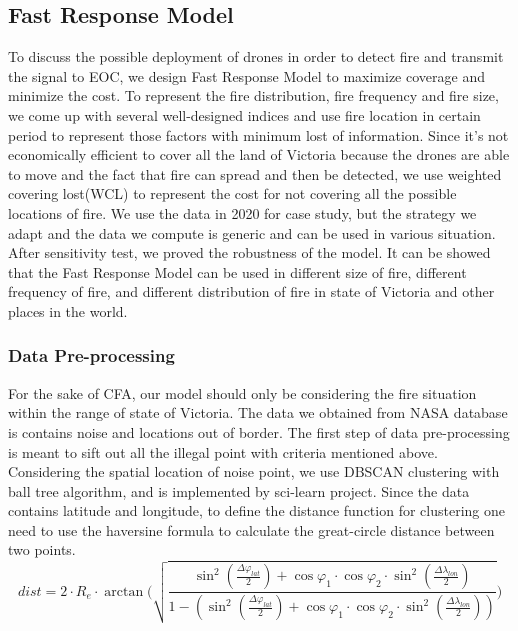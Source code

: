 \documentclass[../main]{subfiles}
\begin{document}
\subsection{Fast Response Model}
To discuss the possible deployment of drones in order to detect fire and transmit the signal to EOC,
 we design Fast Response Model to maximize coverage and minimize the cost. To represent the fire distribution,
  fire frequency and fire size, we come up with several well-designed indices and use fire location in certain
   period to represent those factors with minimum lost of information.  Since it's not economically
    efficient to cover all the land of Victoria because the drones are able to move and the fact that fire can
     spread and then be detected, we use weighted covering lost(WCL) to represent the cost for not covering 
     all the possible locations of fire. We use the data in 2020 for case study, but the strategy we adapt and
      the data we compute is generic and can be used in various situation. \\

      After sensitivity test, we proved the robustness of the model. It can be showed that the Fast Response Model can be used in different size of fire, different frequency of fire, and different distribution of fire in state of Victoria and other places in the world.
\subsubsection{Data Pre-processing}
For the sake of CFA, our model should only be considering the fire situation within the range of state of Victoria. The data we obtained from NASA database is contains noise and locations out of border. The first step of data pre-processing is meant to sift out all the illegal point with criteria mentioned above. Considering the spatial location of noise point,
 we use DBSCAN clustering with ball tree \cite{enwiki:1065597644} algorithm, and is implemented by sci-learn 
 project\cite{scikit-learn}. 
 Since the data contains latitude and longitude, 
 to define the distance function for clustering one need to use the haversine formula\cite{haversine} to calculate the great-circle distance between two points.
\[ dist=2\cdot R_{e} \cdot \arctan \Big( \sqrt{\frac {\sin^2(\frac {\Delta \varphi_{lat} }{2})+\cos\varphi _1\cdot 
\cos \varphi _2 \cdot \sin^2({ \frac {\Delta \lambda_{lon}} {2} })}
{1-(\sin^2(\frac {\Delta \varphi_{lat} }{2})+\cos\varphi _1\cdot 
\cos \varphi _2 \cdot \sin^2({ \frac {\Delta \lambda_{lon}} {2} }))}} \Big) \]

 
\end{document}
